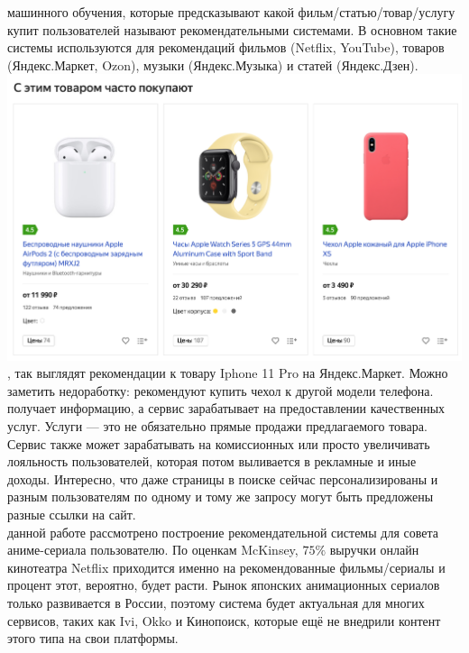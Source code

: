 \documentclass{article}
\newcommand\tab[1][1cm]{\hspace*{#1}}
\begin{document}
 машинного обучения, которые предсказывают какой фильм/статью/товар/услугу купит пользователей называют рекомендательными системами. В основном такие системы используются для рекомендаций фильмов (Netflix, YouTube), товаров (Яндекс.Маркет, Ozon), музыки (Яндекс.Музыка) и статей (Яндекс.Дзен). 
 \includegraphics[width=\linewidth]{f1.png}\\
, так выглядят рекомендации к товару Iphone 11 Pro на Яндекс.Маркет. Можно заметить недоработку: рекомендуют купить чехол к другой модели телефона.\\
 получает информацию, а сервис зарабатывает на предоставлении качественных услуг. Услуги — это не обязательно прямые продажи предлагаемого товара. Сервис также может зарабатывать на комиссионных или просто увеличивать лояльность пользователей, которая потом выливается в рекламные и иные доходы. Интересно, что даже страницы в поиске сейчас персонализированы и разным пользователям по одному и тому же запросу могут быть предложены разные ссылки на сайт.\\
 данной работе рассмотрено построение рекомендательной системы для совета аниме-сериала пользователю. По оценкам McKinsey, $75\%$ выручки онлайн кинотеатра Netflix приходится именно на рекомендованные фильмы/сериалы и процент этот, вероятно, будет расти. Рынок японских анимационных сериалов только развивается в России, поэтому система будет актуальная для многих сервисов, таких как Ivi, Okko и Кинопоиск, которые ещё не внедрили контент этого типа на свои платформы.\\
\qquad 

\newpage
\end{document}
